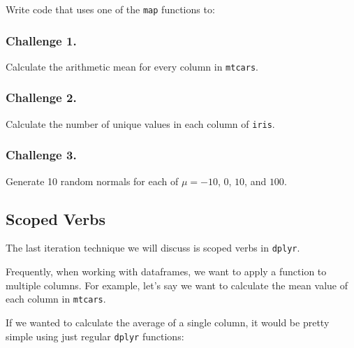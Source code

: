 \documentclass[
]{book}
\newenvironment{Shaded}{\begin{snugshade}}{\end{snugshade}}
\newcommand{\CommentTok}[1]{\textcolor[rgb]{0.56,0.35,0.01}{\textit{#1}}}
\newcommand{\DataTypeTok}[1]{\textcolor[rgb]{0.13,0.29,0.53}{#1}}
\newcommand{\KeywordTok}[1]{\textcolor[rgb]{0.13,0.29,0.53}{\textbf{#1}}}
\newcommand{\NormalTok}[1]{#1}
\newcommand{\OperatorTok}[1]{\textcolor[rgb]{0.81,0.36,0.00}{\textbf{#1}}}
\newcommand{\StringTok}[1]{\textcolor[rgb]{0.31,0.60,0.02}{#1}}
\begin{document}
Write code that uses one of the \texttt{map} functions to:

\hypertarget{challenge-1.-15}{%
\subsubsection*{Challenge 1.}\label{challenge-1.-15}}

Calculate the arithmetic mean for every column in \texttt{mtcars}.

\hypertarget{challenge-2.-14}{%
\subsubsection*{Challenge 2.}\label{challenge-2.-14}}

Calculate the number of unique values in each column of \texttt{iris}.

\hypertarget{challenge-3.-10}{%
\subsubsection*{Challenge 3.}\label{challenge-3.-10}}

Generate 10 random normals for each of \(\mu = -10\), \(0\), \(10\), and \(100\).

\hypertarget{scoped-verbs}{%
\subsection{Scoped Verbs}\label{scoped-verbs}}

The last iteration technique we will discuss is scoped verbs in \texttt{dplyr}.

Frequently, when working with dataframes, we want to apply a function to multiple columns. For example, let's say we want to calculate the mean value of each column in \texttt{mtcars}.

If we wanted to calculate the average of a single column, it would be pretty simple using just regular \texttt{dplyr} functions:

\begin{Shaded}
\end{Shaded}
\end{document}
